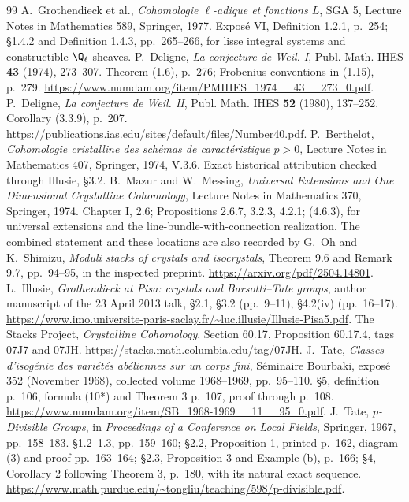 \documentclass[11pt,a4paper]{article}
\theoremstyle{definition}\newtheorem{remark}[theorem]{Remark}
\begin{document}
\begin{thebibliography}{99}
 A.~Grothendieck et al., \emph{Cohomologie $\ell$-adique et fonctions $L$}, SGA 5, Lecture Notes in Mathematics 589, Springer, 1977. Expos\'e VI, Definition 1.2.1, p.~254; \S1.4.2 and Definition 1.4.3, pp.~265--266, for lisse integral systems and constructible $\Q_\ell$ sheaves.
 P.~Deligne, \emph{La conjecture de Weil. I}, Publ. Math. IHES \textbf{43} (1974), 273--307. Theorem (1.6), p.~276; Frobenius conventions in (1.15), p.~279. \url{https://www.numdam.org/item/PMIHES_1974__43__273_0.pdf}.
 P.~Deligne, \emph{La conjecture de Weil. II}, Publ. Math. IHES \textbf{52} (1980), 137--252. Corollary (3.3.9), p.~207. \url{https://publications.ias.edu/sites/default/files/Number40.pdf}.
 P.~Berthelot, \emph{Cohomologie cristalline des sch\'emas de caract\'eristique $p>0$}, Lecture Notes in Mathematics 407, Springer, 1974, V.3.6. Exact historical attribution checked through Illusie, \S3.2.
 B.~Mazur and W.~Messing, \emph{Universal Extensions and One Dimensional Crystalline Cohomology}, Lecture Notes in Mathematics 370, Springer, 1974. Chapter I, 2.6; Propositions 2.6.7, 3.2.3, 4.2.1; (4.6.3), for universal extensions and the line-bundle-with-connection realization. The combined statement and these locations are also recorded by G.~Oh and K.~Shimizu, \emph{Moduli stacks of crystals and isocrystals}, Theorem 9.6 and Remark 9.7, pp.~94--95, in the inspected preprint. \url{https://arxiv.org/pdf/2504.14801}.
 L.~Illusie, \emph{Grothendieck at Pisa: crystals and Barsotti--Tate groups}, author manuscript of the 23 April 2013 talk, \S2.1, \S3.2 (pp.~9--11), \S4.2(iv) (pp.~16--17). \url{https://www.imo.universite-paris-saclay.fr/~luc.illusie/Illusie-Pisa5.pdf}.
 The Stacks Project, \emph{Crystalline Cohomology}, Section 60.17, Proposition 60.17.4, tags 07J7 and 07JH. \url{https://stacks.math.columbia.edu/tag/07JH}.
 J.~Tate, \emph{Classes d'isog\'enie des vari\'et\'es ab\'eliennes sur un corps fini}, S\'eminaire Bourbaki, expos\'e 352 (November 1968), collected volume 1968--1969, pp.~95--110. \S5, definition p.~106, formula (10*) and Theorem 3 p.~107, proof through p.~108. \url{https://www.numdam.org/item/SB_1968-1969__11__95_0.pdf}.
 J.~Tate, \emph{$p$-Divisible Groups}, in \emph{Proceedings of a Conference on Local Fields}, Springer, 1967, pp.~158--183. \S1.2--1.3, pp.~159--160; \S2.2, Proposition 1, printed p.~162, diagram (3) and proof pp.~163--164; \S2.3, Proposition 3 and Example (b), p.~166; \S4, Corollary 2 following Theorem 3, p.~180, with its natural exact sequence. \url{https://www.math.purdue.edu/~tongliu/teaching/598/p-divisible.pdf}.

\end{thebibliography}
\end{document}
